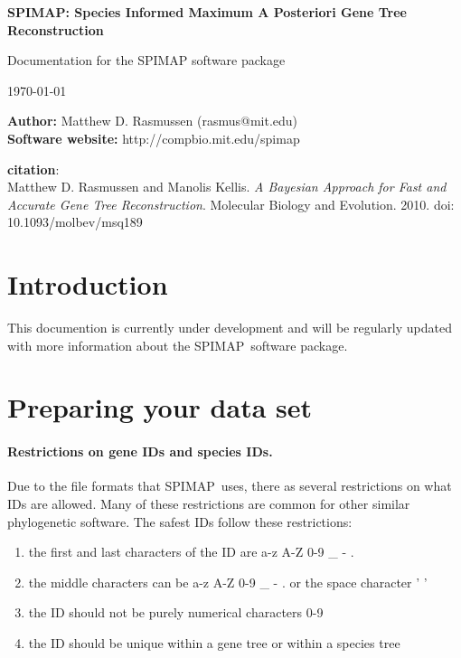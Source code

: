 \documentclass[11pt]{article}
\newcommand{\spimap}{{\sf\scshape SPIMAP}}
\begin{document}

\begin{center}
{\Huge \bf 
SPIMAP: Species Informed Maximum A Posteriori Gene Tree Reconstruction
}

\vspace{.2in}

{\LARGE 
Documentation for the SPIMAP software package
}

{\LARGE \today}


\vspace{.5in}

{\bf Author:} Matthew D. Rasmussen (rasmus@mit.edu) \\
{\bf Software website:} http://compbio.mit.edu/spimap

\vspace{.1in}

{\bf citation}: \\
Matthew D. Rasmussen and Manolis Kellis.
{\it A Bayesian Approach for Fast and Accurate Gene Tree Reconstruction}.
Molecular Biology and Evolution. 2010. doi: 10.1093/molbev/msq189

\end{center}

\newpage

\tableofcontents

\newpage

\section{Introduction}

This documention is currently under development and will be regularly 
updated with more information about the \spimap\ software package.

\section{Preparing your data set}

\paragraph{Restrictions on gene IDs and species IDs.}  Due to the
file formats that \spimap\ uses, there as several restrictions on what IDs
are allowed.  Many of these restrictions are common for other similar
phylogenetic software.  The safest IDs follow these restrictions:
\begin{enumerate}[itemsep=0pt,topsep=0pt]
\item the first and last characters of the ID are a-z A-Z 0-9 \_ - .
\item the middle characters can be a-z A-Z 0-9 \_ - . or the space character ' '
\item the ID should not be purely numerical characters 0-9
\item the ID should be unique within a gene tree or within a species tree
\end{enumerate}
\end{document}
